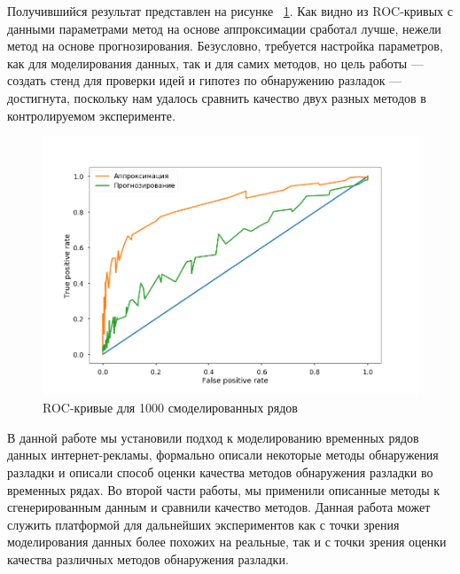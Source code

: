 \documentclass[%
12pt,
master,  %
natbib,      %
subf,        %
substylefile = spbu.rtx,
href,        %
colorlinks,  %
]{disser}
\begin{document}
Получившийся результат представлен на рисунке ~\ref{fig:roc_pred_approx}. Как видно из ROC-кривых с данными параметрами метод на основе аппроксимации сработал лучше, нежели метод на основе прогнозирования. Безусловно, требуется настройка параметров, как для моделирования данных, так и для самих методов, но цель работы --- создать стенд для проверки идей и гипотез по обнаружению разладок --- достигнута, поскольку нам удалось сравнить качество двух разных методов в контролируемом эксперименте.

\begin{figure}[!hhh]
	\begin{center}
		\includegraphics[width=12cm]{roc_pred_approx}
	\end{center}
	\vspace{-5mm}\caption{ROC-кривые для 1000 смоделированных рядов}
	\label{fig:roc_pred_approx}
\end{figure}


\conclusion
В данной работе мы установили подход к моделированию временных рядов данных интернет-рекламы, формально описали некоторые методы обнаружения разладки и описали способ оценки качества методов обнаружения разладки во временных рядах. Во второй части работы, мы применили описанные методы к сгенерированным данным и сравнили качество методов. Данная работа может служить платформой для дальнейших экспериментов как с точки зрения моделирования данных более похожих на реальные, так и с точки зрения оценки качества различных методов обнаружения разладки.




\let\BibEmph=\emph

\end{document}
